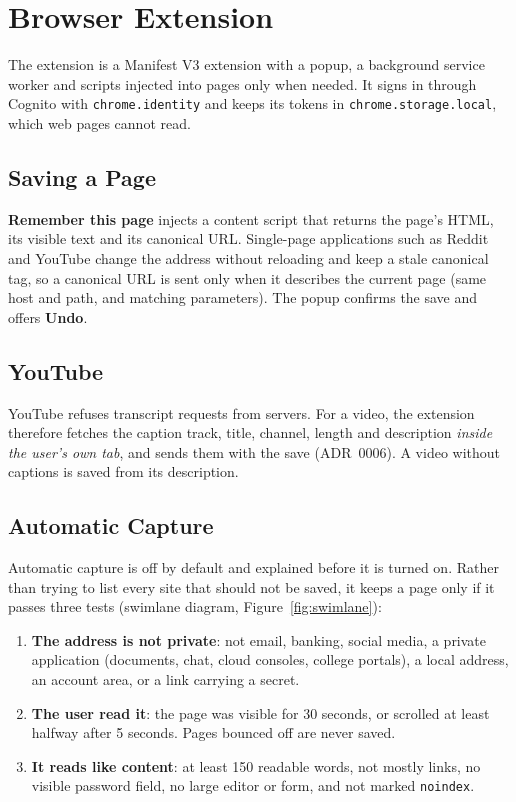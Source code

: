 \section{Browser Extension}

The extension is a Manifest V3 extension \cite{chromemv3} with a popup, a
background service worker and scripts injected into pages only when needed.
It signs in through Cognito with \texttt{chrome.identity} and keeps its
tokens in \texttt{chrome.storage.local}, which web pages cannot read.

\subsection{Saving a Page}

\textbf{Remember this page} injects a content script that returns the page's
HTML, its visible text and its canonical URL. Single-page applications such
as Reddit and YouTube change the address without reloading and keep a stale
canonical tag, so a canonical URL is sent only when it describes the current
page (same host and path, and matching parameters). The popup confirms the
save and offers \textbf{Undo}.

\subsection{YouTube}

YouTube refuses transcript requests from servers. For a video, the
extension therefore fetches the caption track, title, channel, length and
description \emph{inside the user's own tab}, and sends them with the save
(ADR~0006). A video without captions is saved from its description.

\subsection{Automatic Capture}

Automatic capture is off by default and explained before it is turned on.
Rather than trying to list every site that should not be saved, it keeps a
page only if it passes three tests (swimlane diagram, Figure~\ref{fig:swimlane}):

\begin{enumerate}
  \item \textbf{The address is not private}: not email, banking, social
  media, a private application (documents, chat, cloud consoles, college
  portals), a local address, an account area, or a link carrying a secret.
  \item \textbf{The user read it}: the page was visible for 30 seconds, or
  scrolled at least halfway after 5 seconds. Pages bounced off are never
  saved.
  \item \textbf{It reads like content}: at least 150 readable words, not
  mostly links, no visible password field, no large editor or form, and not
  marked \texttt{noindex}.
\end{enumerate}

